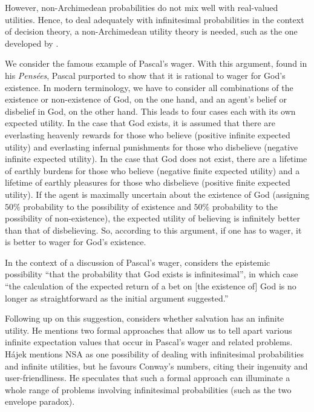 However, non-Archimedean probabilities do not mix well with real-valued utilities. Hence, to deal adequately with infinitesimal probabilities in the context of decision theory, a non-Archimedean utility theory is needed, such as the one developed by \citet{Pivato:2014}.

We consider the famous example of Pascal's wager. With this argument, found in his \textit{Pens{\'e}es}, Pascal purported to show that it is rational to wager for God's existence. In modern terminology, we have to consider all combinations of the existence or non-existence of God, on the one hand, and an agent's belief or disbelief in God, on the other hand. This leads to four cases each with its own expected utility. In the case that God exists, it is assumed that there are everlasting heavenly rewards for those who believe (positive infinite expected utility) and everlasting infernal punishments for those who disbelieve (negative infinite expected utility). In the case that God does not exist, there are a lifetime of earthly burdens for those who believe (negative finite expected utility) and a lifetime of earthly pleasures for those who disbelieve (positive finite expected utility). If the agent is maximally uncertain about the existence of God (assigning $50\%$ probability to the possibility of existence and $50\%$ probability to the possibility of non-existence), the expected utility of believing is infinitely better than that of disbelieving. So, according to this argument, if one has to wager, it is better to wager for God's existence.

In the context of a discussion of Pascal's wager, \citet[p.~163]{Oppy:1990} considers the epistemic possibility ``that the probability that God exists is infinitesimal'', in which case ``the calculation of the expected return of a bet on [the existence of] God is no longer as straightforward as the initial argument suggested.''

Following up on this suggestion, \citet{Hajek:2003b} considers whether salvation has an infinite utility. He mentions two formal approaches that allow us to tell apart various infinite expectation values that occur in Pascal's wager and related problems. H\'ajek mentions NSA as one possibility of dealing with infinitesimal probabilities and infinite utilities, but he favours Conway's numbers, citing their ingenuity and user-friendliness. He speculates that such a formal approach can illuminate a whole range of problems involving infinitesimal probabilities (such as the two envelope paradox).

